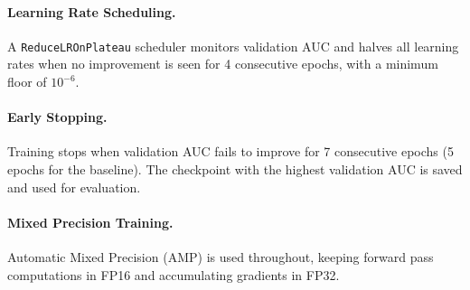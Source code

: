 \paragraph{Learning Rate Scheduling.}
A \texttt{ReduceLROnPlateau} scheduler monitors validation AUC and halves all learning rates when no improvement is seen for 4 consecutive epochs, with a minimum floor of $10^{-6}$.

\paragraph{Early Stopping.}
Training stops when validation AUC fails to improve for 7 consecutive epochs (5 epochs for the baseline). The checkpoint with the highest validation AUC is saved and used for evaluation.

\paragraph{Mixed Precision Training.}
Automatic Mixed Precision (AMP) is used throughout, keeping forward pass computations in FP16 and accumulating gradients in FP32.

